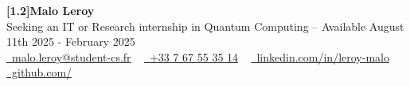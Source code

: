 \begin{center}
    {\Huge\bfseries\sffamily \scalebox{1.0}[1.2]{Malo Leroy}}
    \\ Seeking an IT or Research internship in Quantum Computing -- Available August 11th 2025 - February 2025 \\
    \small
    \href{mailto:malo.leroy@student-cs.fr}{\raisebox{-0.2\height}\faEnvelope\  malo.leroy@student-cs.fr} ~
    \href{tel:+33767553514}{\raisebox{-0.2\height}\faPhone\  {+33 7 67 55 35 14}} ~
    \href{https://linkedin.com/in/leroy-malo}{\raisebox{-0.2\height}\faLinkedin\ linkedin.com/in/leroy-malo}  ~
    \href{https://github.com/\ghusername}{\raisebox{-0.2\height}\faGithub\ github.com/\ghusername}
\end{center}
